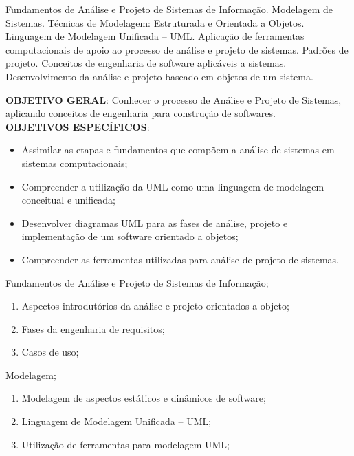 \begin{pud}
	
	
	\ementa
	Fundamentos de Análise e Projeto de Sistemas de Informação. Modelagem de Sistemas. Técnicas de Modelagem: Estruturada e Orientada a Objetos. Linguagem de Modelagem Unificada -- UML. Aplicação de ferramentas computacionais de apoio ao processo de análise e projeto de sistemas. Padrões de projeto. Conceitos de engenharia de software aplicáveis a sistemas. Desenvolvimento da análise e projeto baseado em objetos de um sistema.
	
	\objetivos
	\textbf{OBJETIVO GERAL}:
	Conhecer o processo de Análise e Projeto de Sistemas, aplicando conceitos de engenharia para construção de softwares.	
	\newline\\	
	\textbf{OBJETIVOS ESPECÍFICOS}:
	\begin{itemize}
		
		\item Assimilar as etapas e fundamentos que compõem a análise de sistemas em sistemas computacionais;
		\item Compreender a utilização da UML como uma linguagem de modelagem conceitual e unificada;
		\item Desenvolver diagramas UML para as fases de análise, projeto e implementação de um software orientado a objetos;
		\item Compreender as ferramentas utilizadas para análise de projeto de sistemas. 

	\end{itemize}
	
	\programa
	\begin{description}[itemsep=0em]
		\item[UNIDADE I:] Fundamentos de Análise e Projeto de Sistemas de Informação; 
	         \begin{enumerate}[itemsep=0em, topsep=0em]
				\item Aspectos introdutórios da análise e projeto orientados a objeto;
               	\item Fases da engenharia de requisitos;
               	\item Casos de uso;
            \end{enumerate}
            
        \item[UNIDADE II:] Modelagem;
	         \begin{enumerate}[itemsep=0em, topsep=0em]
				\item Modelagem de aspectos estáticos e dinâmicos de software;
                \item  Linguagem de Modelagem Unificada -- UML;
				\item  Utilização de ferramentas para modelagem UML;
            \end{enumerate}


\end{description}
\end{pud}
